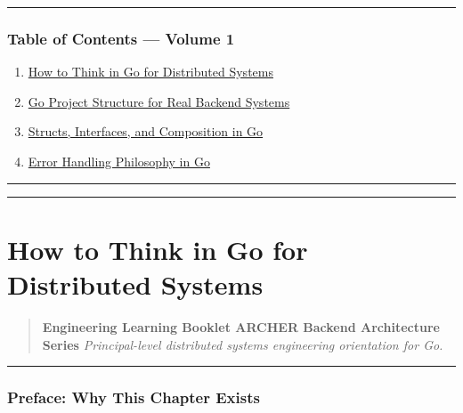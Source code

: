 \documentclass[11pt,openany]{book}
\providecommand{\tightlist}{%
  \setlength{\itemsep}{0pt}\setlength{\parskip}{0pt}}
\begin{document}
\begin{center}\rule{0.5\linewidth}{0.5pt}\end{center}

\hypertarget{table-of-contents-volume-1}{%
\subsection{Table of Contents --- Volume
1}\label{table-of-contents-volume-1}}

\begin{enumerate}
\def\labelenumi{\arabic{enumi}.}
\tightlist
\item
  \protect\hyperlink{chapter-01--how-to-think-in-go-for-distributed-systems}{How
  to Think in Go for Distributed Systems}
\item
  \protect\hyperlink{chapter-02--go-project-structure-for-real-backend-systems}{Go
  Project Structure for Real Backend Systems}
\item
  \protect\hyperlink{chapter-03--structs-interfaces-and-composition-in-go}{Structs,
  Interfaces, and Composition in Go}
\item
  \protect\hyperlink{chapter-04--error-handling-philosophy-in-go}{Error
  Handling Philosophy in Go}
\end{enumerate}

\begin{center}\rule{0.5\linewidth}{0.5pt}\end{center}

\begin{center}\rule{0.5\linewidth}{0.5pt}\end{center}

\hypertarget{chapter-01-how-to-think-in-go-for-distributed-systems}{%
\chapter{How to Think in Go for Distributed
Systems}\label{chapter-01-how-to-think-in-go-for-distributed-systems}}

\begin{quote}
\textbf{Engineering Learning Booklet \textbar{} ARCHER Backend
Architecture Series} \emph{Principal-level distributed systems
engineering orientation for Go.}
\end{quote}

\begin{center}\rule{0.5\linewidth}{0.5pt}\end{center}

\hypertarget{preface-why-this-chapter-exists}{%
\subsection{Preface: Why This Chapter
Exists}\label{preface-why-this-chapter-exists}}
\end{document}
